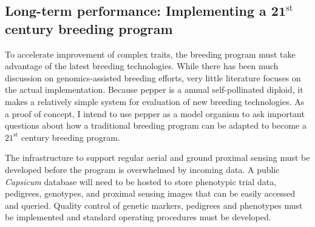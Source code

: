 \documentclass[11pt]{article}
\begin{document}




















\subsection*{Long-term performance: Implementing a $\mathbf{21}^\text{st}$ century breeding program}

To accelerate improvement of complex traits, the breeding program must take advantage of the latest breeding technologies. While there has been much discussion on genomics-assisted breeding efforts, very little literature focuses on the actual implementation. Because pepper is a annual self-pollinated diploid, it makes a relatively simple system for evaluation of new breeding technologies. As a proof of concept, I intend to use pepper as a model organism to ask important questions about how a traditional breeding program can be adapted to become a $21^\text{st}$ century breeding program. 

The infrastructure to support regular aerial and ground proximal sensing must be developed before the program is overwhelmed by incoming data. A public \emph{Capsicum} database will need to be hosted to store phenotypic trial data, pedigrees, genotypes, and proximal sensing images that can be easily accessed and queried. Quality control of genetic markers, pedigrees and phenotypes must be implemented and standard operating procedures must be developed. %
\end{document}
